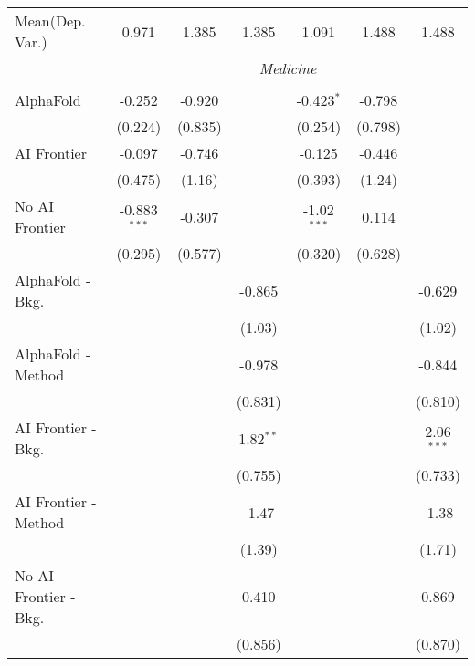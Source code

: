 \begin{tabular}{lcccccc}
Mean(Dep. Var.) & 0.971 & 1.385 & 1.385 & 1.091 & 1.488 & 1.488 \\
 & \multicolumn{6}{c}{\textit{Medicine}} \\ \\
   AlphaFold               & -0.252         & -0.920  &               & -0.423$^{*}$  & -0.798  &   \\   
                           & (0.224)        & (0.835) &               & (0.254)       & (0.798) &   \\   
   AI Frontier             & -0.097         & -0.746  &               & -0.125        & -0.446  &   \\   
                           & (0.475)        & (1.16)  &               & (0.393)       & (1.24)  &   \\   
   No AI Frontier          & -0.883$^{***}$ & -0.307  &               & -1.02$^{***}$ & 0.114   &   \\   
                           & (0.295)        & (0.577) &               & (0.320)       & (0.628) &   \\   
   AlphaFold - Bkg.        &                &         & -0.865        &               &         & -0.629\\   
                           &                &         & (1.03)        &               &         & (1.02)\\   
   AlphaFold - Method      &                &         & -0.978        &               &         & -0.844\\   
                           &                &         & (0.831)       &               &         & (0.810)\\   
   AI Frontier - Bkg.      &                &         & 1.82$^{**}$   &               &         & 2.06$^{***}$\\   
                           &                &         & (0.755)       &               &         & (0.733)\\   
   AI Frontier - Method    &                &         & -1.47         &               &         & -1.38\\   
                           &                &         & (1.39)        &               &         & (1.71)\\   
   No AI Frontier - Bkg.   &                &         & 0.410         &               &         & 0.869\\   
                           &                &         & (0.856)       &               &         & (0.870)\\   

\end{tabular}
